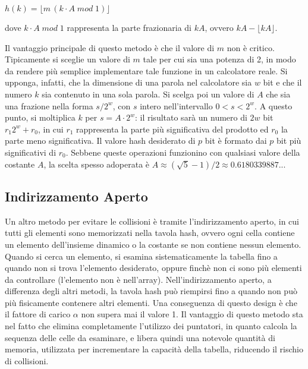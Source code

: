 \(h(k) = \lfloor m\,(k\cdot A\;mod\;1)\rfloor\)

\noindent dove \(k\cdot A \; mod \;1 \) rappresenta la parte frazionaria di \(kA\), ovvero \(kA-\lfloor kA\rfloor\). 

Il vantaggio principale di questo metodo è che il valore di \(m\) non è critico. Tipicamente si sceglie un valore di \(m\) tale per cui sia una potenza di 2, in modo da rendere più semplice implementare tale funzione in un calcolatore reale. Si upponga, infatti, che la dimensione di una parola nel calcolatore sia \(w\) bit e che il numero \(k\) sia contenuto in una sola parola. Si scelga poi un valore di \(A\) che sia una frazione nella forma \(s/2^w\), con \(s\) intero nell'intervallo \(0<s<2^w\). A questo punto, si moltiplica \(k\) per \(s=A\cdot 2^w\): il risultato sarà un numero di \(2w\) bit \(r_1 2^w+r_0\), in cui \(r_1\) rappresenta la parte più significativa del prodotto ed \(r_0\) la parte meno significativa. Il valore hash desiderato di \(p\) bit è formato dai \(p\) bit più significativi di \(r_0\). Sebbene queste operazioni funzionino con qualsiasi valore della costante \(A\), la scelta spesso adoperata è \(A \approx (\sqrt{5}-1)/2 \approx 0.6180339887...\)

\subsection{Indirizzamento Aperto}
Un altro metodo per evitare le collisioni è tramite l'indirizzamento aperto, in cui tutti gli elementi sono memorizzati nella tavola hash, ovvero ogni cella contiene un elemento dell'insieme dinamico o la costante  se non contiene nessun elemento. Quando si cerca un elemento, si esamina sistematicamente la tabella fino a quando non si trova l'elemento desiderato, oppure finchè non ci sono più elementi da controllare (l'elemento non è nell'array). Nell'indirizzamento aperto, a differenza degli altri metodi, la tavola hash può riempirsi fino a quando non può più fisicamente contenere altri elementi. Una conseguenza di questo design è che il fattore di carico \(\alpha\) non supera mai il valore 1. Il vantaggio di questo metodo sta nel fatto che elimina completamente l'utilizzo dei puntatori, in quanto calcola la sequenza delle celle da esaminare, e libera quindi una notevole quantità di memoria, utilizzata per incrementare la capacità della tabella, riducendo il rischio di collisioni. 

